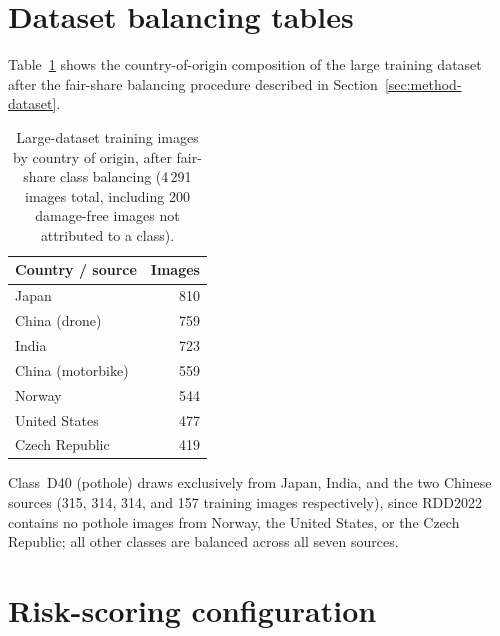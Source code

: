 \documentclass[10pt,a4paper,twocolumn]{article}
\begin{document}
\onecolumn



\newpage
\onecolumn  %

\appendix
\renewcommand{\thetable}{\Alph{section}.\arabic{table}}
\renewcommand{\thefigure}{\Alph{section}.\arabic{figure}}
\setcounter{table}{0}
\setcounter{figure}{0}

\section{Dataset balancing tables}
\label{app:balancing}

Table~\ref{tab:balancing-country} shows the country-of-origin composition
of the large training dataset after the fair-share balancing procedure
described in Section~\ref{sec:method-dataset}.

\begin{table}[h]
  \centering
  \caption{Large-dataset training images by country of origin, after
  fair-share class balancing (4\,291 images total, including 200 damage-free
  images not attributed to a class).}
  \label{tab:balancing-country}
  \begin{tabular}{lr}
    \toprule
    Country / source & Images \\
    \midrule
    Japan              & 810 \\
    China (drone)      & 759 \\
    India              & 723 \\
    China (motorbike)  & 559 \\
    Norway             & 544 \\
    United States      & 477 \\
    Czech Republic     & 419 \\
    \bottomrule
  \end{tabular}
\end{table}

Class~D40 (pothole) draws exclusively from Japan, India, and the two
Chinese sources (315, 314, 314, and 157 training images respectively),
since RDD2022 contains no pothole images from Norway, the United States,
or the Czech Republic; all other classes are balanced across all seven
sources.

\section{Risk-scoring configuration}
\label{app:risk-config}
\end{document}
